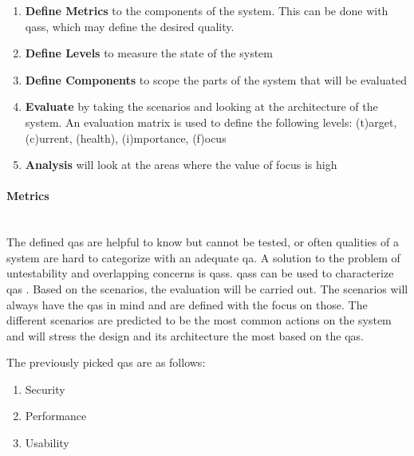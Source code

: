 \begin{enumerate}
    \item \textbf{Define Metrics} to the components of the system. This can be done with \glspl{qas}, which may define the desired quality.
    \item \textbf{Define Levels} to measure the state of the system
    \item \textbf{Define Components} to scope the parts of the system that will be evaluated
    \item \textbf{Evaluate} by taking the scenarios and looking at the architecture of the system. An evaluation matrix is used to define the following levels: (t)arget, (c)urrent, (health), (i)mportance, (f)ocus
    \item \textbf{Analysis} will look at the areas where the value of focus is high
\end{enumerate}

\paragraph{Metrics}\mbox{}\\

The defined \glspl{qa} are helpful to know but cannot be tested, or often qualities of a system are hard to categorize with an adequate \gls{qa}. A solution to the problem of untestability and overlapping concerns is \glspl{qas}. \glspl{qas} can be used to characterize \glspl{qa} \cite{BassSoftwareArchitecture2003}. Based on the scenarios, the evaluation will be carried out. The scenarios will always have the \glspl{qa} in mind and are defined with the focus on those. The different scenarios are predicted to be the most common actions on the system and will stress the design and its architecture the most based on the \glspl{qa}.

The previously picked \glspl{qa} are as follows:

\begin{enumerate}
    \item Security
    \item Performance
    \item Usability
\end{enumerate}

